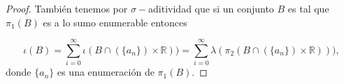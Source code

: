 \documentclass[letter,twoside,12pt]{article}
\numberwithin{equation}{section}
\begin{document}
\begin{enumerate}[label = (\textbf{\arabic*.})]
\begin{enumerate}[label = (\textbf{\roman*.})]
\begin{proof}
También tenemos por $\sigma-$aditividad que si un conjunto $B$ es tal que $\pi_1(B)$ es a lo sumo enumerable entonces

 \begin{equation}
 \iota(B) =  \sum_{i=0}^\infty \iota(B \cap (\{a_n\}) \times \mathbb{R})) = \sum_{i=0}^\infty \lambda(\pi_2(B \cap (\{a_n\}) \times \mathbb{R}))), \label{eq:sumcontable}
 \end{equation}
donde $\{a_n\}$ es una enumeración de $\pi_1(B)$.
%
%
%
%
%
%
%
%
%


\end{proof}
\end{enumerate}
\end{enumerate}
\end{document}
